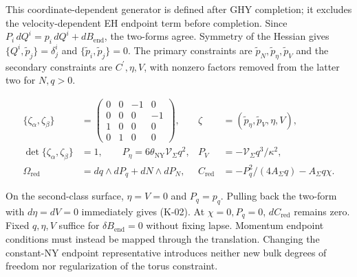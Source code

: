 This coordinate-dependent generator is defined after GHY completion; it excludes the velocity-dependent EH endpoint term before completion. Since $P_i\,dQ^i=p_i\,dQ^i+dB_{\mathrm{end}}$, the two-forms agree. Symmetry of the Hessian gives $\{Q^i,\widetilde p_j\}=\delta^i_j$ and $\{\widetilde p_i,\widetilde p_j\}=0$. The primary constraints are $\widetilde p_N,\widetilde p_\eta,\widetilde p_V$ and the secondary constraints are $C^{\prime},\eta,V$, with nonzero factors removed from the latter two for $N,q>0$.

\begin{equation}\tag{K-02}\label{eq:K-02}
\begin{aligned}
\{\zeta_\alpha,\zeta_\beta\}
&=\begin{pmatrix}0&0&-1&0\\0&0&0&-1\\1&0&0&0\\0&1&0&0\end{pmatrix},
&\zeta&=(\widetilde p_\eta,\widetilde p_V,\eta,V),\\
\det\{\zeta_\alpha,\zeta_\beta\}&=1,\qquad
P_\eta=6\theta_{\mathrm{NY}}\mathcal V_{\Sigma}q^2,&
P_V&=-\mathcal V_{\Sigma}q^3/\kappa^2,\\
\Omega_{\mathrm{red}}&=dq\wedge dP_q+dN\wedge dP_N,&
C_{\mathrm{red}}&=-P_q^2/(4A_{\Sigma}q)-A_{\Sigma}q\chi.
\end{aligned}
\end{equation}

On the second-class surface, $\eta=V=0$ and $P_q=p_q$. Pulling back the two-form with $d\eta=dV=0$ immediately gives (K-02). At $\chi=0,P_q=0$, $dC_{\mathrm{red}}$ remains zero. Fixed $q,\eta,V$ suffice for $\delta B_{\mathrm{end}}=0$ without fixing lapse. Momentum endpoint conditions must instead be mapped through the translation. Changing the constant-NY endpoint representative introduces neither new bulk degrees of freedom nor regularization of the torus constraint.
